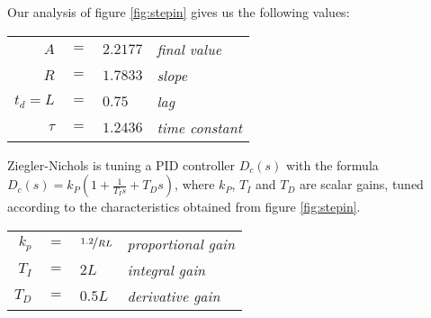 Our analysis of figure \ref{fig:stepin} gives us the following values:
\\
\begin{tabular}{r c l l}
	$A$ 	& $=$ & $2.2177$ 	& \footnotesize{\textit{final value}}\\
	$R$ 	& $=$ & $1.7833$ 	& \footnotesize{\textit{slope}}\\
	$t_d=L$	& $=$ & $0.75$ 		& \footnotesize{\textit{lag}}\\
	$\tau$ 	& $=$ & $1.2436$ 	& \footnotesize{\textit{time constant}}
\end{tabular}

Ziegler-Nichols is tuning a PID controller $D_c(s)$ with the formula\\
$D_c(s)=k_P(1+ \frac{1}{T_Is}+T_Ds)$,
where $k_P$, $T_I$ and $T_D$ are scalar gains,
tuned according to the characteristics obtained from figure \ref{fig:stepin}.

\begin{tabular}{r c l l}
	$k_p$ & $=$ & $\nicefrac{1.2}{RL}$	& \footnotesize{\textit{proportional gain}}\\
	$T_I$ & $=$ & $2L$					& \footnotesize{\textit{integral gain}}\\
	$T_D$ & $=$ & $0.5L$ 				& \footnotesize{\textit{derivative gain}}\\
\end{tabular}



\label{fig:stepin}
